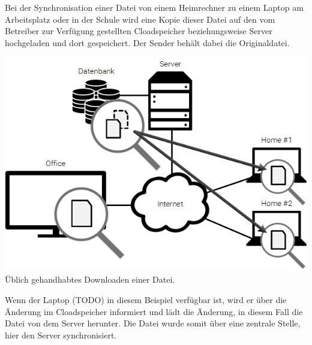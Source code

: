 Bei der Synchronisation einer Datei von einem Heimrechner zu einem Laptop am
Arbeitsplatz oder in der Schule wird eine Kopie dieser Datei auf den vom
Betreiber zur Verfügung gestellten Cloadspeicher beziehungsweise Server
hochgeladen und dort gespeichert. Der Sender behält dabei die Originaldatei.

\includegraphics[]{images/Dropbox_2}
Üblich gehandhabtes Downloaden einer Datei.

Wenn der Laptop (TODO) in diesem Beispiel verfügbar ist, wird er über die Änderung
im Cloadspeicher informiert und lädt die Änderung, in diesem Fall die Datei von
dem Server herunter. Die Datei wurde somit über eine zentrale Stelle, hier den
Server synchronisiert.

